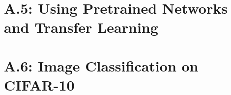\documentclass[]{article}
\begin{document}
\section*{A.5: Using Pretrained Networks and Transfer Learning}
    
\section*{A.6: Image Classification on CIFAR-10}
        
    
        
\end{document}
